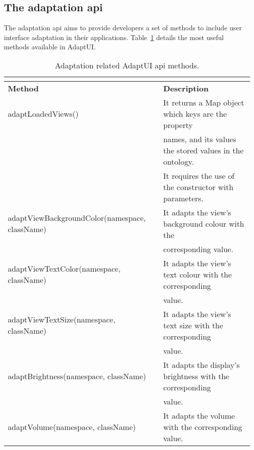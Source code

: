 \subsection{The adaptation \ac{api}}
\label{sec:adaptation_api}

The adaptation \ac{api} aims to provide developers a set of methods to include
user interface adaptation in their applications. Table~\ref{tbl:api_adaptation} 
details the most useful methods available in AdaptUI.

\begin{center}
\footnotesize
\begin{longtable}{l l}
  \caption{Adaptation related AdaptUI \ac{api} methods.}\\
  \label{tbl:api_adaptation} \\
  \hline 
  \textbf{Method}				& \textbf{Description}					\\
  \hline
  adaptLoadedViews()				& It returns a Map object which keys are the property	\\
						& names, and its values the stored values in the ontology.\\
						& It requires the use of the constructor with parameters.\\
  adaptViewBackgroundColor(namespace, className)& It adapts the view's background colour with the 	\\
						& corresponding value.					\\
  adaptViewTextColor(namespace, className)	& It adapts the view's text colour with the corresponding\\
						& value.						\\
  adaptViewTextSize(namespace, className)	& It adapts the view's text size with the corresponding	\\
						& value.						\\
  adaptBrightness(namespace, className)		& It adapts the display's brightness with the corresponding\\
						& value.						\\
  adaptVolume(namespace, className)		& It adapts the volume with the corresponding value.	\\
  \hline
\end{longtable}
\end{center}